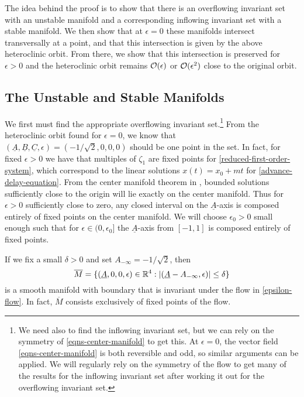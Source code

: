 The idea behind the proof is to show that there is an overflowing invariant set with an unstable manifold and a corresponding inflowing invariant set with a stable manifold. We then show that at \(\epsilon = 0\) these manifolds intersect transversally at a point, and that this intersection is given by the above heteroclinic orbit. From there, we show that this intersection is preserved for \(\epsilon > 0\) and the heteroclinic orbit remains \(\mathcal{O}(\epsilon)\) or \(\mathcal{O}(\epsilon^2)\) close to the original orbit.

\subsection{The Unstable and Stable Manifolds}\label{sec:manifolds}

We first must find the appropriate overflowing invariant set.\footnote{We need also to find the inflowing invariant set, but we can rely on the symmetry of \cref{eqns-center-manifold} to get this. At \(\epsilon = 0\), the vector field \cref{eqns-center-manifold} is both reversible and odd, so similar arguments can be applied. We will regularly rely on the symmetry of the flow to get many of the results for the inflowing invariant set after working it out for the overflowing invariant set.} From the heteroclinic orbit found for \(\epsilon = 0\), we know that \((\underline A,\underline B,\underline C, \epsilon) = (-1/\sqrt 2 , 0 ,0, 0)\) should be one point in the set. In fact, for fixed \(\epsilon> 0\) we have that multiples of \(\zeta_1\) are fixed points for \cref{reduced-first-order-system}, which correspond to the linear solutions \(x(t) = x_0 + mt\) for \cref{advance-delay-equation}. From the center manifold theorem in \cite{vanderbauwhede1992center}, bounded solutions sufficiently close to the origin will lie exactly on the center manifold. Thus for \(\epsilon>0\) sufficiently close to zero, any closed interval on the \(\underline A\)-axis is composed entirely of fixed points on the center manifold. We will choose \(\epsilon_0> 0\) small enough such that for \(\epsilon \in (0,\epsilon_0]\) the \(\underline A\)-axis from \([-1,1]\) is composed entirely of fixed points. 



If we fix a small \(\delta > 0\) and set \(A_{-\infty} = - 1/ \sqrt 2\), then 
\begin{equation*}
	\overline M = \{(\underline A, 0, 0, \epsilon) \in \mathbb{R}^4: |(\underline A - A_{-\infty},  \epsilon)| \leq \delta\}
\end{equation*}
is a smooth manifold with boundary that is invariant under the flow in \cref{epsilon-flow}. In fact, \(\overline M\) consists exclusively of fixed points of the flow.


